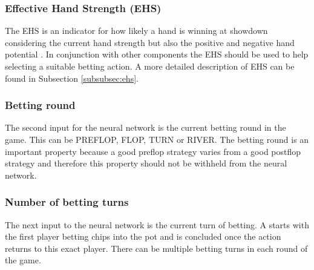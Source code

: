 \subsubsection{Effective Hand Strength (EHS)}
The EHS is an indicator for how likely a hand is winning at showdown considering the current hand strength but also the positive and negative hand potential \cite{evolutionary_methods}. In conjunction with other components the EHS should be used to help selecting a suitable betting action. A more detailed description of EHS can be found in Subsection \ref{subsubsec:ehs}.
\subsubsection{Betting round}
The second input for the neural network is the current betting round in the game. This can be PREFLOP, FLOP, TURN or RIVER. The betting round is an important property because a good preflop strategy varies from a good postflop strategy and therefore this property should not be withheld from the neural network.
\subsubsection{Number of betting turns}
The next input to the neural network is the current turn of betting. A  starts with the first player betting chips into the pot and is concluded once the action returns to this exact player. There can be multiple betting turns in each round of the game. 
